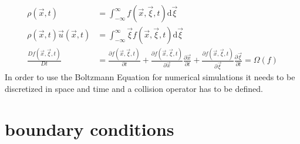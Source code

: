 \begin{align}
	\rho(\vec{x}, t) &= \int_{-\infty}^{\infty} f(\vec{x}, \vec{\xi}, t) \mathrm{d}\vec{\xi} \label{eq:rho} \\
	\rho(\vec{x}, t) \vec{u}(\vec{x}, t) &= \int_{-\infty}^{\infty} \vec{\xi} f(\vec{x}, \vec{\xi}, t) \mathrm{d}\vec{\xi} \label{eq:velocity}\\
	\frac{D f(\vec{x}, \vec{\xi}, t)}{Dt} &= \frac{ \partial f(\vec{x}, \vec{\xi}, t)}{\partial t} + \frac{ \partial f(\vec{x}, \vec{\xi}, t)}{\partial\vec{x}} \frac{\partial \vec{x}}{\partial t} + \frac{ \partial f(\vec{x}, \vec{\xi}, t)}{\partial \vec{\xi}} \frac{\partial \vec{\xi}}{\partial t} =  \Omega(f) \label{eq:boltzmann}
\end{align}
In order to use the Boltzmann Equation for numerical simulations it needs to be discretized in space and time and a collision operator has to be defined.

\section{boundary conditions}